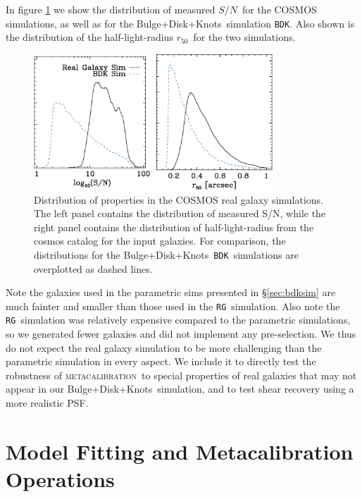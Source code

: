 \documentclass[iop]{emulateapj}
\newcommand{\snr}{$S/N$}
\newcommand{\hlr}{$r_{50}$}
\newcommand{\mcal}{\textsc{metacalibration}}
\newcommand{\bdkfull}{Bulge+Disk+Knots}
\newcommand{\bdksim}{\texttt{BDK}}
\newcommand{\rgsim}{\texttt{RG}}
\begin{document}
In figure \ref{fig:cosmos} we show the distribution of measured \snr\ for the
COSMOS simulations, as well as for the \bdkfull\ simulation
\bdksim.  Also shown is the distribution of the half-light-radius \hlr\
for the two simulations.

\begin{figure}
	\begin{center}
    \includegraphics[width=0.8\textwidth]{mcal-v14s01-s2n-and-r50-with-nsim.eps}

		\caption{Distribution of properties in the COSMOS real galaxy simulations. The
		left panel contains the distribution of measured S/N, while the right panel contains
		the distribution of half-light-radius from the cosmos catalog for the input
		galaxies.  For comparison, the distributions for the \bdkfull\ \bdksim\ simulations
		are overplotted as dashed lines.}
	\end{center}
\label{fig:cosmos}
\end{figure}


Note the galaxies used in the parametric sims presented in \S \ref{sec:bdksim}
are much fainter and
smaller than those used in the \rgsim\ simulation.  Also note the \rgsim\ simulation
was relatively expensive compared to the parametric simulations, so we
generated fewer galaxies and did not implement any pre-selection.  We thus do
not expect the real galaxy simulation to be more challenging than the
parametric simulation in every aspect. We include it to directly test the
robustness of \mcal\ to special properties of real galaxies that may not appear
in our \bdkfull\ simulation, and to test shear recovery using a more
realistic PSF.  


\section{Model Fitting and Metacalibration Operations} \label{sec:modelfit}
\end{document}
